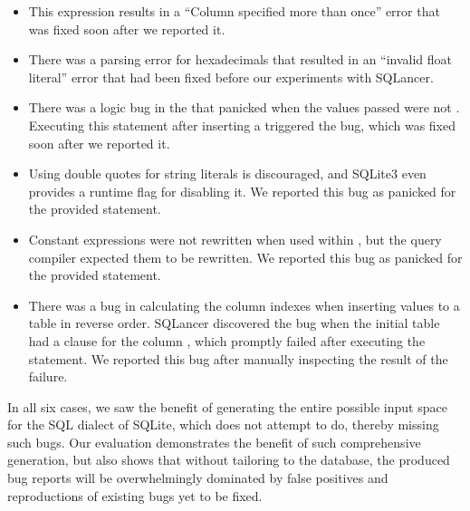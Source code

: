 \begin{itemize}
  \item {}

        This expression results in a ``Column specified more than once'' error that was fixed
        soon after we reported it.
  \item {}

        There was a parsing error for hexadecimals that resulted in an ``invalid float
        literal'' error that had been fixed before our experiments with SQLancer.
  \item {}

        There was a logic bug in the  that panicked when the values passed were not
        . Executing this statement after inserting a  triggered the bug,
        which was fixed soon after we reported it.
  \item {}

        Using double quotes for string literals is discouraged, and SQLite3 even provides a
        runtime flag for disabling it. We reported this bug as \db{} panicked for the provided
        statement.
  \item {}

        Constant  expressions were not rewritten when used within ,
        but the query compiler expected them to be rewritten. We reported this bug as \db{}
        panicked for the provided statement.
  \item {}

        There was a bug in calculating the column indexes when inserting values to a table in
        reverse order. SQLancer discovered the bug when the initial table  had a
         clause for the column , which promptly failed after executing
        the statement. We reported this bug after manually inspecting the result of the
        failure.
\end{itemize}

In all six cases, we saw the benefit of generating the entire possible input space for
the SQL dialect of SQLite, which \tool{} does not attempt to do, thereby missing such
bugs. Our evaluation demonstrates the benefit of such comprehensive generation, but
also shows that without tailoring to the database, the produced bug reports will be
overwhelmingly dominated by false positives and reproductions of existing bugs yet to
be fixed.

